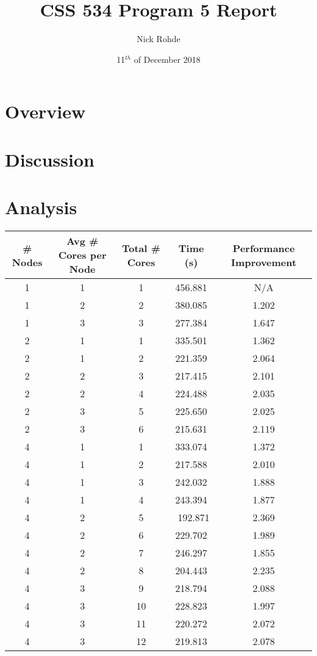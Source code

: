 \documentclass{article}
\author{Nick Rohde}
\title{CSS 534 Program 5 Report}
\date{11$^{th}$ of December 2018}
\begin{document}
\maketitle
\tableofcontents
\pagebreak
	
	\section{Overview} \label{OVERVIEW}
		
	
	\section{Discussion} \label{DISCUSSION}

	
	\section{Analysis} \label{ANALYSIS}


		\begin{minipage}{\linewidth}
			\centering
			\begin{tabular}{ccc|cc}\label{T1}
				\# Nodes & Avg \# Cores per Node & Total \# Cores & Time (s) & Performance Improvement\\
				\hline
				1	& 1		& 1		& 456.881	& N/A\\
				1	& 2		& 2		& 380.085	&1.202\\
				1	& 3		& 3		& 277.384	&1.647\\
				\hline
				2	& 1		& 1		& 335.501	&1.362\\
				2	& 1		& 2		& 221.359	&2.064\\
				2	& 2		& 3		& 217.415	&2.101\\
				2	& 2		& 4		& 224.488	&2.035\\
				2	& 3		& 5		& 225.650	&2.025\\
				2	& 3		& 6		& 215.631	&2.119\\
				\hline
				4	& 1		& 1		& 333.074	&1.372\\
				4   & 1     & 2		& 217.588	&2.010\\
				4	& 1		& 3		& 242.032	&1.888\\
				4	& 1		& 4		& 243.394	&1.877\\
				4	& 2		& 5		& \color{red} ~192.871 \color{black}	&\color{red} 2.369 \color{black}\\
				4   & 2     & 6		& 229.702	&1.989\\
				4	& 2		& 7		& 246.297	&1.855\\
				4	& 2		& 8		& 204.443	&2.235\\
				4	& 3		& 9		& 218.794	&2.088\\
				4   & 3     & 10	& 228.823	&1.997\\
				4	& 3		& 11	& 220.272	&2.072\\
				4	& 3		& 12	& 219.813	&2.078\\
			\end{tabular}
		\smallskip\smallskip\smallskip\smallskip
		\end{minipage}
\end{document}
